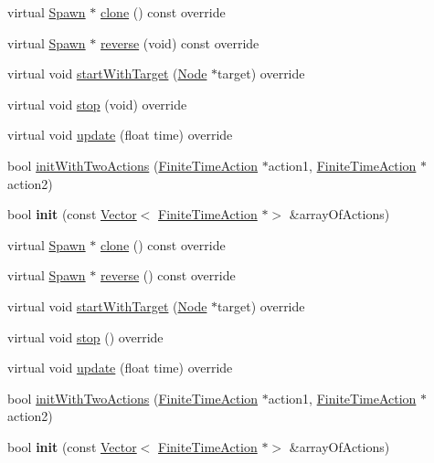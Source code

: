 \begin{DoxyCompactItemize}
\item 
virtual \hyperlink{classSpawn}{Spawn} $\ast$ \hyperlink{classSpawn_a1c7481d301d5144cf1609296274d0f9d}{clone} () const override
\item 
virtual \hyperlink{classSpawn}{Spawn} $\ast$ \hyperlink{classSpawn_a1000d2ebd49581fd3a9bb7adc74a1492}{reverse} (void) const override
\item 
virtual void \hyperlink{classSpawn_a12784be2d96c07bacacdb92f53c02c70}{start\+With\+Target} (\hyperlink{classNode}{Node} $\ast$target) override
\item 
virtual void \hyperlink{classSpawn_ab743d2f0b325be11b8939162d9d8984c}{stop} (void) override
\item 
virtual void \hyperlink{classSpawn_a31d8a91378f9ebe0c639fa63a999c34e}{update} (float time) override
\item 
bool \hyperlink{classSpawn_a7ca09352e8571699efd1582b0ad5ef45}{init\+With\+Two\+Actions} (\hyperlink{classFiniteTimeAction}{Finite\+Time\+Action} $\ast$action1, \hyperlink{classFiniteTimeAction}{Finite\+Time\+Action} $\ast$action2)
\item 
\mbox{\label{classSpawn_a619f4557a58d5710e7cb6031fb6b272f}} 
bool {\bfseries init} (const \hyperlink{classVector}{Vector}$<$ \hyperlink{classFiniteTimeAction}{Finite\+Time\+Action} $\ast$$>$ \&array\+Of\+Actions)
\item 
virtual \hyperlink{classSpawn}{Spawn} $\ast$ \hyperlink{classSpawn_ad564aef525ff1be991b3a8edb989f163}{clone} () const override
\item 
virtual \hyperlink{classSpawn}{Spawn} $\ast$ \hyperlink{classSpawn_a6cf6f6f320f49ca3364a50e873cb9a03}{reverse} () const override
\item 
virtual void \hyperlink{classSpawn_a183fd0e3f0c44e3526e7196c32b3c80e}{start\+With\+Target} (\hyperlink{classNode}{Node} $\ast$target) override
\item 
virtual void \hyperlink{classSpawn_a6b4b872928f24b722fda9d7428178a56}{stop} () override
\item 
virtual void \hyperlink{classSpawn_a49981c1b744173b40ac032815306bbcc}{update} (float time) override
\item 
bool \hyperlink{classSpawn_a7ca09352e8571699efd1582b0ad5ef45}{init\+With\+Two\+Actions} (\hyperlink{classFiniteTimeAction}{Finite\+Time\+Action} $\ast$action1, \hyperlink{classFiniteTimeAction}{Finite\+Time\+Action} $\ast$action2)
\item 
\mbox{\label{classSpawn_a619f4557a58d5710e7cb6031fb6b272f}} 
bool {\bfseries init} (const \hyperlink{classVector}{Vector}$<$ \hyperlink{classFiniteTimeAction}{Finite\+Time\+Action} $\ast$$>$ \&array\+Of\+Actions)
\end{DoxyCompactItemize}
